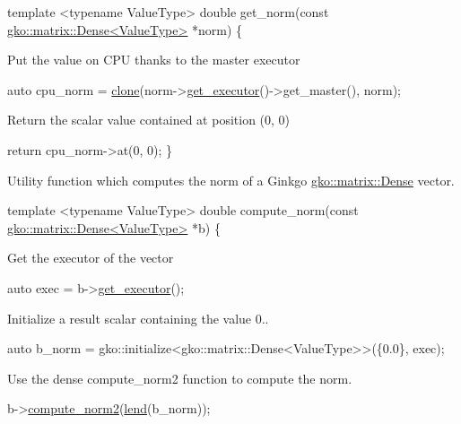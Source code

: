 \begin{DoxyCode}
\textcolor{keyword}{template} <\textcolor{keyword}{typename} ValueType>
\textcolor{keywordtype}{double} get\_norm(\textcolor{keyword}{const} \hyperlink{classgko_1_1matrix_1_1Dense}{gko::matrix::Dense<ValueType>} *norm)
\{
\end{DoxyCode}


Put the value on C\+PU thanks to the master executor


\begin{DoxyCode}
\textcolor{keyword}{auto} cpu\_norm = \hyperlink{namespacegko_a1beb80750459e4201aa9d882d2d074c3}{clone}(norm->\hyperlink{classgko_1_1PolymorphicObject_ab40586bff071b7f11c2cf6b5cbf598eb}{get\_executor}()->get\_master(), norm);
\end{DoxyCode}


Return the scalar value contained at position (0, 0)


\begin{DoxyCode}
    \textcolor{keywordflow}{return} cpu\_norm->at(0, 0);
\}
\end{DoxyCode}


Utility function which computes the norm of a Ginkgo \hyperlink{classgko_1_1matrix_1_1Dense}{gko\+::matrix\+::\+Dense} vector.


\begin{DoxyCode}
\textcolor{keyword}{template} <\textcolor{keyword}{typename} ValueType>
\textcolor{keywordtype}{double} compute\_norm(\textcolor{keyword}{const} \hyperlink{classgko_1_1matrix_1_1Dense}{gko::matrix::Dense<ValueType>} *b)
\{
\end{DoxyCode}


Get the executor of the vector


\begin{DoxyCode}
\textcolor{keyword}{auto} exec = b->\hyperlink{classgko_1_1PolymorphicObject_ab40586bff071b7f11c2cf6b5cbf598eb}{get\_executor}();
\end{DoxyCode}


Initialize a result scalar containing the value 0..


\begin{DoxyCode}
\textcolor{keyword}{auto} b\_norm = gko::initialize<gko::matrix::Dense<ValueType>>(\{0.0\}, exec);
\end{DoxyCode}


Use the dense {\ttfamily compute\+\_\+norm2} function to compute the norm.


\begin{DoxyCode}
b->\hyperlink{classgko_1_1matrix_1_1Dense_a97fd354c4a26814586cd256b5f0d7bea}{compute\_norm2}(\hyperlink{namespacegko_aa8cb4876b72e5e1036ea9575443c439b}{lend}(b\_norm));
\end{DoxyCode}


